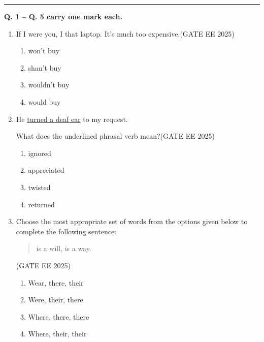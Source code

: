 


\author{EE25BTECH11005 - Aditya Mishra}
\rule{\columnwidth}{0.3pt}

\textbf{Q. 1 -- Q. 5 carry one mark each.}

\begin{enumerate}
\item If I were you, I \underline{\hspace{2.5cm}} that laptop. It’s much too expensive.\hfill {(GATE EE 2025)}

\begin{multicols}{2}
\begin{enumerate}
\item won’t buy
\item shan’t buy
\item wouldn’t buy
\item would buy
\end{enumerate}
\end{multicols}



\item He \underline{turned a deaf ear} to my request. 

What does the underlined phrasal verb mean?\hfill {(GATE EE 2025)}

\begin{multicols}{2}
\begin{enumerate}
\item ignored
\item appreciated
\item twisted
\item returned
\end{enumerate}
\end{multicols}


\item Choose the most appropriate set of words from the options given below to complete the following sentence:

\begin{quote}
\underline{\hspace{3cm}} \quad \underline{\hspace{3cm}} \quad is a will, \quad \underline{\hspace{3cm}} \quad is a way.
\end{quote}
\hfill {(GATE EE 2025)}
\begin{multicols}{2}
\begin{enumerate}
\item Wear, there, their
\item Were, their, there
\item Where, there, there
\item Where, their, their
\end{enumerate}
\end{multicols}




\end{enumerate}
